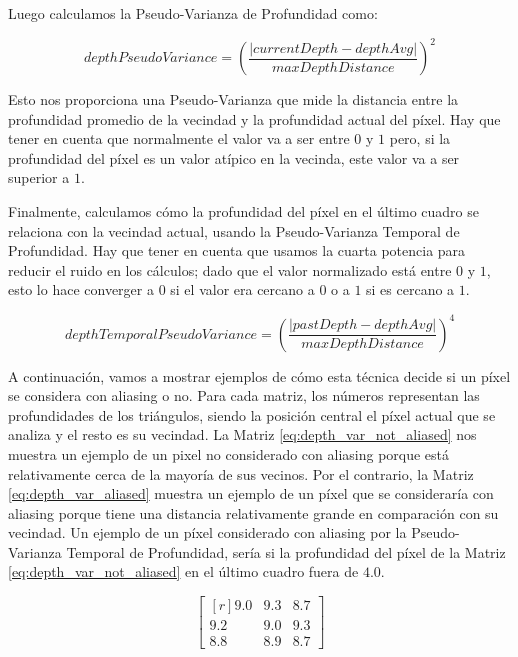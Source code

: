 \documentclass[pregrado]{tesis-usb} %
\begin{document}
Luego calculamos la Pseudo-Varianza de Profundidad como:

\begin{equation} \label{eq:depthpseudovariance}
	depthPseudoVariance = \left( \frac{\left|currentDepth-depthAvg\right|}{maxDepthDistance}\right)^2
\end{equation}

Esto nos proporciona una Pseudo-Varianza que mide la distancia entre la profundidad promedio de la vecindad y la profundidad actual del píxel. Hay que tener en cuenta que normalmente el valor va a ser entre $0$ y $1$ pero, si la profundidad del píxel es un valor atípico en la vecinda, este valor va a ser superior a $1$.

Finalmente, calculamos cómo la profundidad del píxel en el último cuadro se relaciona con la vecindad actual, usando la Pseudo-Varianza Temporal de Profundidad. Hay que tener en cuenta que usamos la cuarta potencia para reducir el ruido en los cálculos; dado que el valor normalizado está entre $0$ y $1$, esto lo hace converger a $0$ si el valor era cercano a $0$ o a $1$ si es cercano a $1$.

\begin{equation} \label{eq:depthtemporalpseudovariance}
depthTemporalPseudoVariance = \left( \frac{\left|pastDepth-depthAvg\right|}{maxDepthDistance}\right)^4
\end{equation}

A continuación, vamos a mostrar ejemplos de cómo esta técnica decide si un píxel se considera con aliasing o no. Para cada matriz, los números representan las profundidades de los triángulos, siendo la posición central el píxel actual que se analiza y el resto es su vecindad. La Matriz \ref{eq:depth_var_not_aliased} nos muestra un ejemplo de un pixel no considerado con aliasing porque está relativamente cerca de la mayoría de sus vecinos. Por el contrario, la Matriz \ref{eq:depth_var_aliased} muestra un ejemplo de un píxel que se consideraría con aliasing porque tiene una distancia relativamente grande en comparación con su vecindad. Un ejemplo de un píxel considerado con aliasing por la Pseudo-Varianza Temporal de Profundidad, sería si la profundidad del píxel de la Matriz \ref{eq:depth_var_not_aliased} en el último cuadro fuera de $4.0$.

\begin{equation}\label{eq:depth_var_not_aliased}
\begin{bmatrix*}[r]
9.0 &  9.3 & 8.7 \\
9.2 &  9.0 & 9.3 \\
8.8 &  8.9 & 8.7
\end{bmatrix*}
\end{equation}
\end{document}

